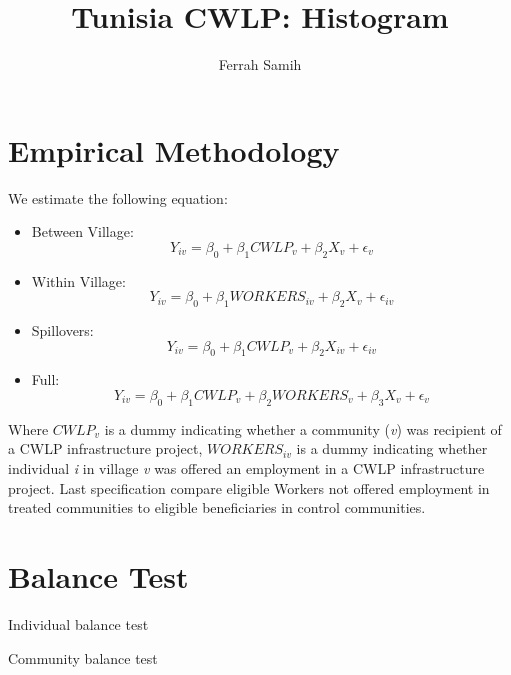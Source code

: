 \documentclass[10pt,a4paper]{article}
\begin{document}
\author{Ferrah Samih}\title{Tunisia CWLP: Histogram}\maketitle
\pagebreak
\listoffigures
\pagebreak

\section{Empirical Methodology}
We estimate the following equation:
\begin{itemize}
\item Between Village: \begin{equation} Y_{iv} = \beta_{0} + \beta_{1}CWLP_{v} + \beta_{2}X_{v} + \epsilon_{v} \end{equation}
\item Within Village: \begin{equation} Y_{iv} = \beta_{0} + \beta_{1}WORKERS_{iv} + \beta_{2}X_{v} + \epsilon_{iv} \end{equation}
\item Spillovers: \begin{equation} Y_{iv} = \beta_{0} + \beta_{1}CWLP_{v} + \beta_{2}X_{iv} + \epsilon_{iv} \end{equation}
\item Full: \begin{equation} Y_{iv} = \beta_{0} + \beta_{1}CWLP_{v} + \beta_{2}WORKERS_{v} + \beta_{3}X_{v} + \epsilon_{v} \end{equation}
\end{itemize}
Where $ CWLP_{v} $ is a dummy indicating whether a community (\textit{v}) was recipient of a CWLP infrastructure project, $ WORKERS_{iv} $ is a dummy indicating whether individual \textit{i} in village \textit{v} was offered an employment in a CWLP infrastructure project. Last specification compare eligible Workers not offered employment in treated communities to eligible beneficiaries in control communities.
\pagebreak
\section{Balance Test}
\begin{table}[H]\centering\caption{Individual balance test}
\resizebox{\textwidth}{!}{}
\end{table}
\begin{table}[H]\centering\caption{Community balance test}
\resizebox{\textwidth}{!}{}
\end{table}
\pagebreak
\end{document}
